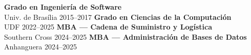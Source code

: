                       

\medskip
{}
      

\medskip
{}
\textbf{Grado en Ingeniería de Software}\\{\small Univ. de Brasília \textbullet{} 2015--2017}
\divider
\textbf{Grado en Ciencias de la Computación}\\{\small UDF \textbullet{} 2022--2025}
\divider
\textbf{MBA — Cadena de Suministro y Logística}\\{\small Southern Cross \textbullet{} 2024--2025}
\divider
\textbf{MBA — Administración de Bases de Datos}\\{\small Anhanguera \textbullet{} 2024--2025}
